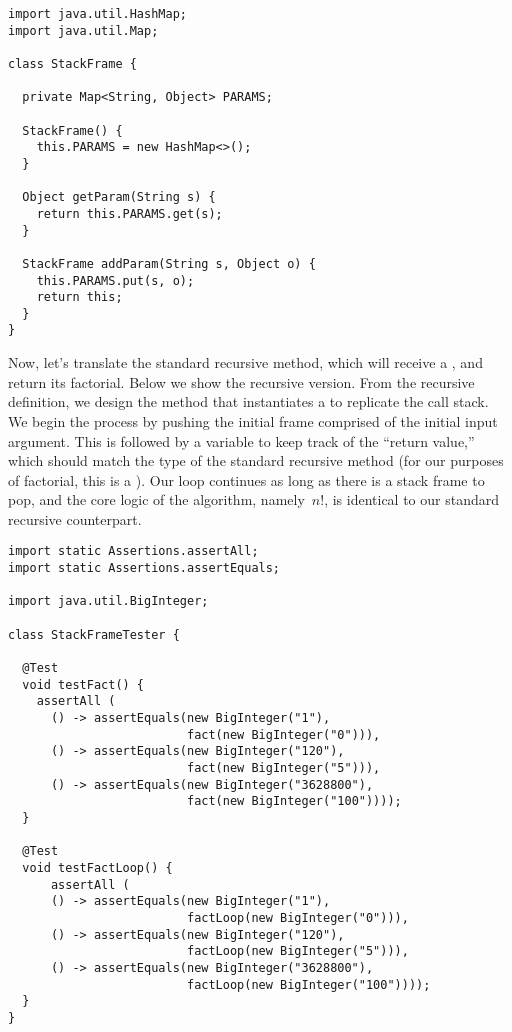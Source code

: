 \begin{lstlisting}[language=MyJava]
import java.util.HashMap;
import java.util.Map;

class StackFrame {

  private Map<String, Object> PARAMS;

  StackFrame() { 
    this.PARAMS = new HashMap<>(); 
  }

  Object getParam(String s) { 
    return this.PARAMS.get(s); 
  }

  StackFrame addParam(String s, Object o) {
    this.PARAMS.put(s, o);
    return this;
  }
}
\end{lstlisting}

Now, let's translate the standard recursive  method, which will receive a , and return its factorial. 
Below we show the recursive version. 
From the recursive definition, we design the  method that instantiates a  to replicate the call stack. 
We begin the process by pushing the initial frame comprised of the initial input argument. 
This is followed by a variable to keep track of the ``return value,'' which should match the type of the standard recursive method (for our purposes of factorial, this is a ). 
Our loop continues as long as there is a stack frame to pop, and the core logic of the algorithm, namely~$n!$, is identical to our standard recursive counterpart.

\begin{lstlisting}[language=MyJava]
import static Assertions.assertAll;
import static Assertions.assertEquals;

import java.util.BigInteger;

class StackFrameTester {

  @Test
  void testFact() {
    assertAll (
      () -> assertEquals(new BigInteger("1"), 
                         fact(new BigInteger("0"))),
      () -> assertEquals(new BigInteger("120"), 
                         fact(new BigInteger("5"))),
      () -> assertEquals(new BigInteger("3628800"), 
                         fact(new BigInteger("100"))));
  }

  @Test
  void testFactLoop() {
      assertAll (
      () -> assertEquals(new BigInteger("1"), 
                         factLoop(new BigInteger("0"))),
      () -> assertEquals(new BigInteger("120"), 
                         factLoop(new BigInteger("5"))),
      () -> assertEquals(new BigInteger("3628800"), 
                         factLoop(new BigInteger("100"))));
  }
}  
\end{lstlisting}

